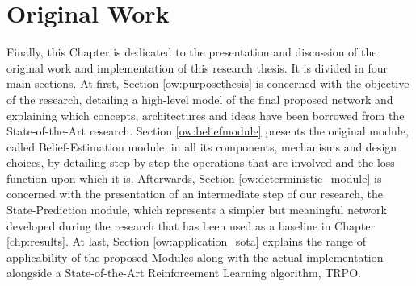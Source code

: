 \chapter{Original Work}
    \label{chp:ow}
    Finally, this Chapter is dedicated to the presentation and discussion of the original work and implementation of this research thesis. It is divided in four main sections. At first, Section \ref{ow:purposethesis} is concerned with the objective of the research, detailing a high-level model of the final proposed network and explaining which concepts, architectures and ideas have been borrowed from the State-of-the-Art research. Section \ref{ow:beliefmodule} presents the original module, called Belief-Estimation module, in all its components, mechanisms and design choices, by detailing step-by-step the operations that are involved and the loss function upon which it is. Afterwards, Section \ref{ow:deterministic_module} is concerned with the presentation of an intermediate step of our research, the State-Prediction module, which represents a simpler but meaningful network developed during the research that has been used as a baseline in Chapter \ref{chp:results}. At last, Section \ref{ow:application_sota} explains the range of applicability of the proposed Modules along with the actual implementation alongside a State-of-the-Art Reinforcement Learning algorithm, TRPO.
    
